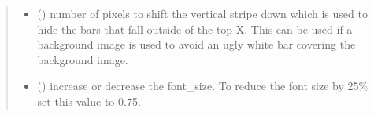 \documentclass[letterpaper,10pt,english]{sphinxmanual}
\begin{document}
\begin{fulllineitems}
\begin{quote}
\begin{description}
\begin{itemize}
\item {} 
\sphinxAtStartPar
{} () \textendash{} number of pixels to shift the vertical stripe down which is used to hide the bars that fall outside of the top X. This can be used if a background image is used to avoid an ugly white bar covering the background image.

\item {} 
\sphinxAtStartPar
{} () \textendash{} increase or decrease the font\_size. To reduce the font size by 25\% set this value to 0.75.

\end{itemize}

\end{description}\end{quote}

\begin{fulllineitems}
\label{\detokenize{index:sjvisualizer.BarRace.bar_race.draw}}
\pysigstartsignatures
{}
\pysigstopsignatures
\end{fulllineitems}


\begin{fulllineitems}
\label{\detokenize{index:sjvisualizer.BarRace.bar_race.update}}
\pysigstartsignatures
{}
\pysigstopsignatures
\end{fulllineitems}


\end{fulllineitems}

\end{document}
